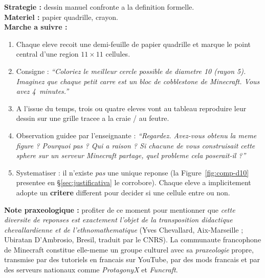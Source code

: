 \documentclass[12pt,a4paper]{scrartcl}
\newcommand{\acc}[1]{\textcolor{accent}{\textbf{#1}}}
\newcommand{\tempo}[1]{\textnormal{\footnotesize\color{bg!90!white}\textsf{#1}}}
\begin{document}
\begin{activite}[1.2 --- Problematisation \quad\tempo{15 min}]
\textbf{Strategie :} dessin manuel confronte a la definition formelle. \\[0.4em]
\textbf{Materiel :} papier quadrille, crayon. \\[0.4em]
\textbf{Marche a suivre :}
\begin{enumerate}[leftmargin=1.5em,itemsep=0.2em,topsep=0.3em,nosep]
  \item Chaque eleve recoit une demi-feuille de papier quadrille et marque le point central d'une region $11 \times 11$ cellules.
  \item Consigne : \emph{\enquote{Coloriez le meilleur cercle possible de diametre 10 (rayon 5). \emph{Imaginez que chaque petit carre est un bloc de cobblestone de Minecraft.} Vous avez 4~minutes.}}
  \item A l'issue du temps, trois ou quatre eleves vont au tableau reproduire leur dessin sur une grille tracee a la craie / au feutre.
  \item Observation guidee par l'enseignant\textperiodcentered e : \emph{\enquote{Regardez. Avez-vous obtenu la meme figure ? Pourquoi pas ? Qui a raison ? Si chacun\textperiodcentered e de vous construisait cette sphere sur un serveur Minecraft partage, quel probleme cela poserait-il ?}}
  \item Systematiser : il n'existe \emph{pas} une unique reponse (la Figure~\ref{fig:comp-d10} presentee en §\ref{sec:justificativa} le corrobore). Chaque eleve a implicitement adopte un \acc{critere} different pour decider si une cellule entre ou non.
\end{enumerate}

\textbf{Note praxeologique :} profiter de ce moment pour mentionner que \emph{cette diversite de reponses est exactement l'objet de la transposition didactique chevallardienne et de l'ethnomathematique} (Yves Chevallard, Aix-Marseille ; Ubiratan D'Ambrosio, Bresil, traduit par le CNRS). La communaute francophone de Minecraft constitue elle-meme un groupe culturel avec sa \emph{praxeologie} propre, transmise par des tutoriels en francais sur YouTube, par des mods francais et par des serveurs nationaux comme \emph{ProtagonyX} et \emph{Funcraft}.
\end{activite}
\end{document}
